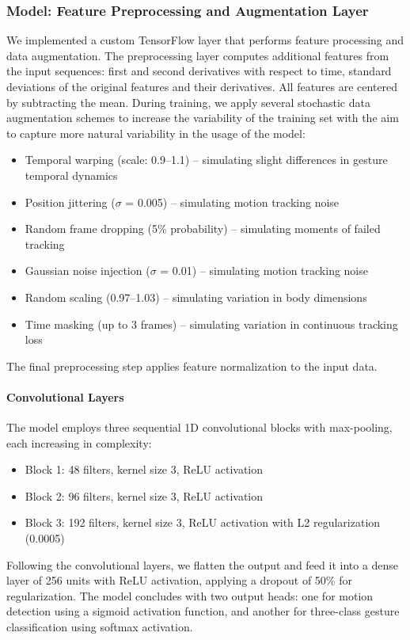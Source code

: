 \documentclass[11pt,headings=small,cleardoublepage=empty,tocflat,numbers=noenddot,twoside,captions=tableheading]{scrbook}
\begin{document}
\begin{refsection}
\subsubsection{Model: Feature Preprocessing and Augmentation Layer}
We implemented a custom TensorFlow layer that performs feature processing and data augmentation. The preprocessing layer computes additional features from the input sequences: first and second derivatives with respect to time, standard deviations of the original features and their derivatives. All features are centered by subtracting the mean.
During training, we apply several stochastic data augmentation schemes to increase the variability of the training set with the aim to capture more natural variability in the usage of the model:
\begin{itemize}
\item Temporal warping (scale: 0.9--1.1) -- simulating slight differences in gesture temporal dynamics
\item Position jittering ($\sigma$ = 0.005) -- simulating motion tracking noise
\item Random frame dropping (5\% probability) -- simulating moments of failed tracking
\item Gaussian noise injection ($\sigma$ = 0.01) -- simulating motion tracking noise
\item Random scaling (0.97--1.03) -- simulating variation in body dimensions
\item Time masking (up to 3 frames) -- simulating variation in continuous tracking loss
\end{itemize}
The final preprocessing step applies feature normalization to the input data.
\paragraph{Convolutional Layers}
The model employs three sequential 1D convolutional blocks with max-pooling, each increasing in complexity:
\begin{itemize}
\item Block 1: 48 filters, kernel size 3, ReLU activation
\item Block 2: 96 filters, kernel size 3, ReLU activation
\item Block 3: 192 filters, kernel size 3, ReLU activation with L2 regularization (0.0005)
\end{itemize}
Following the convolutional layers, we flatten the output and feed it into a dense layer of 256 units with ReLU activation, applying a dropout of 50\% for regularization. The model concludes with two output heads: one for motion detection using a sigmoid activation function, and another for three-class gesture classification using softmax activation.



\end{refsection}
\end{document}
